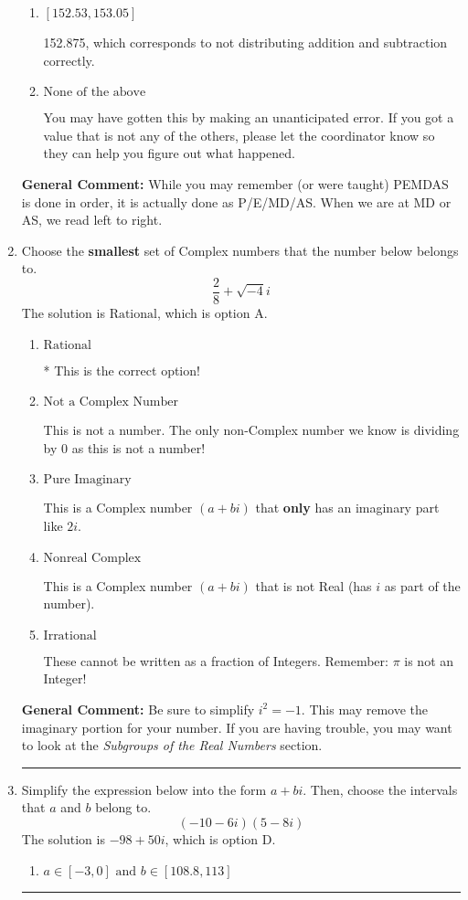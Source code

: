 \documentclass{extbook}[14pt]
\newcommand{\litem}[1]{\item #1

\rule{\textwidth}{0.4pt}}
\begin{document}
\begin{enumerate}
{\begin{enumerate}[label=\Alph*.]
* -127.500, which is the correct option.
\item \( [152.53, 153.05] \)

 152.875, which corresponds to not distributing addition and subtraction correctly.
\item \( \text{None of the above} \)

 You may have gotten this by making an unanticipated error. If you got a value that is not any of the others, please let the coordinator know so they can help you figure out what happened.
\end{enumerate}

\textbf{General Comment:} While you may remember (or were taught) PEMDAS is done in order, it is actually done as P/E/MD/AS. When we are at MD or AS, we read left to right.
}
\litem{
Choose the \textbf{smallest} set of Complex numbers that the number below belongs to.
\[ \frac{2}{8}+\sqrt{-4}i \]The solution is \( \text{Rational} \), which is option A.\begin{enumerate}[label=\Alph*.]
\item \( \text{Rational} \)

* This is the correct option!
\item \( \text{Not a Complex Number} \)

This is not a number. The only non-Complex number we know is dividing by 0 as this is not a number!
\item \( \text{Pure Imaginary} \)

This is a Complex number $(a+bi)$ that \textbf{only} has an imaginary part like $2i$.
\item \( \text{Nonreal Complex} \)

This is a Complex number $(a+bi)$ that is not Real (has $i$ as part of the number).
\item \( \text{Irrational} \)

These cannot be written as a fraction of Integers. Remember: $\pi$ is not an Integer!
\end{enumerate}

\textbf{General Comment:} Be sure to simplify $i^2 = -1$. This may remove the imaginary portion for your number. If you are having trouble, you may want to look at the \textit{Subgroups of the Real Numbers} section.
}
\litem{
Simplify the expression below into the form $a+bi$. Then, choose the intervals that $a$ and $b$ belong to.
\[ (-10 - 6 i)(5 - 8 i) \]The solution is \( -98 + 50 i \), which is option D.\begin{enumerate}[label=\Alph*.]
\item \( a \in [-3, 0] \text{ and } b \in [108.8, 113] \)


\end{enumerate}}
\end{enumerate}
\end{document}
